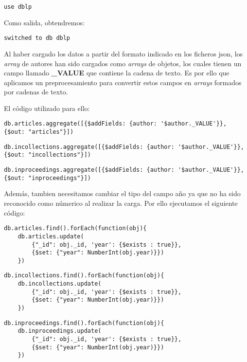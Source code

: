 \begin{verbatim}
use dblp
\end{verbatim}

Como salida, obtendremos:

\begin{verbatim}
switched to db dblp
\end{verbatim}

Al haber cargado los datos a partir del formato indicado en los ficheros json, los \textit{array} de autores han sido cargados como \textit{arrays} de objetos, los cuales tienen un campo llamado \textbf{\_VALUE} que contiene la cadena de texto. Es por ello que aplicamos un preprocesamiento para convertir estos campos en \textit{arrays} formados por cadenas de texto.

El código utilizado para ello:

\begin{verbatim}
db.articles.aggregate([{$addFields: {author: '$author._VALUE'}}, {$out: "articles"}])
\end{verbatim}
\begin{verbatim}
db.incollections.aggregate([{$addFields: {author: '$author._VALUE'}}, {$out: "incollections"}])
\end{verbatim}
\begin{verbatim}
db.inproceedings.aggregate([{$addFields: {author: '$author._VALUE'}}, {$out: "inproceedings"}])
\end{verbatim}

Además, tambien necesitamos cambiar el tipo del campo año ya que no ha sido reconocido como númerico al realizar la carga. Por ello ejecutamos el siguiente código:
  
\begin{verbatim}
db.articles.find().forEach(function(obj){
    db.articles.update(
        {"_id": obj._id, 'year': {$exists : true}},
        {$set: {"year": NumberInt(obj.year)}})
    })
\end{verbatim}

\begin{verbatim}
db.incollections.find().forEach(function(obj){
    db.incollections.update(
        {"_id": obj._id, 'year': {$exists : true}},
        {$set: {"year": NumberInt(obj.year)}})
    })
\end{verbatim}

\begin{verbatim}
db.inproceedings.find().forEach(function(obj){
    db.inproceedings.update(
        {"_id": obj._id, 'year': {$exists : true}},
        {$set: {"year": NumberInt(obj.year)}})
    })
\end{verbatim}

